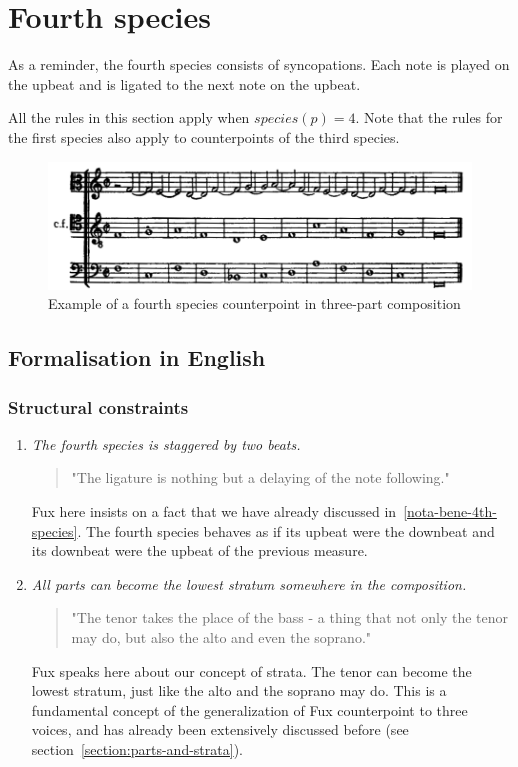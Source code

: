 \section{Fourth species}
As a reminder, the fourth species consists of syncopations. Each note is played on the upbeat and is ligated to the next note on the upbeat.

All the rules in this section apply when $species(p) =4$. Note that the rules for the first species also apply to counterpoints of the third species.

\begin{figure}[h]
    \centering
    \includegraphics[width=1\textwidth]{Images/Species_examples/4sp-example.png}
    \caption{Example of a fourth species counterpoint in three-part composition}
    \label{fig:example-4sp}
\end{figure}

\subsection{Formalisation in English}\label{formalisation-en-4th}
\subsubsection{Structural constraints}
\begin{enumerate}[wide, label=\bfseries 4.S\arabic*]
\setcounter{enumi}{0}
    \item \textit{The fourth species is staggered by two beats.} \label{rule:delaying}    
    \begin{quotation}
        "The ligature is nothing but a delaying of the note following."
        \textcite[p.95]{GaPEng}
    \end{quotation}
    Fux here insists on a fact that we have already discussed in~\ref{nota-bene-4th-species}. The fourth species behaves as if its upbeat were the downbeat and its downbeat were the upbeat of the previous measure.

    \item \textit{All parts can become the lowest stratum somewhere in the composition.} \label{rule:tenor-might-take-place-of-bass}    
    \begin{quotation}
        "The tenor takes the place of the bass - a thing that not only the tenor may do, but also the alto and even the soprano."
        \textcite[p.100]{GaPEng}
    \end{quotation}
    Fux speaks here about our concept of strata. The tenor can become the lowest stratum, just like the alto and the soprano may do. This is a fundamental concept of the generalization of Fux counterpoint to three voices, and has already been extensively discussed before (see section~\ref{section:parts-and-strata}).
\end{enumerate}

